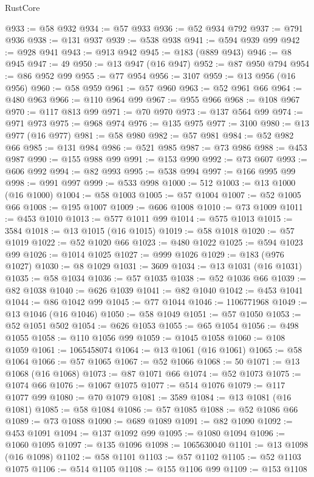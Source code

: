\begin{lexlean}{RustCore}
\begin{coremodule}
@933 := @58 @932
@934 := @57 @933
@936 := @52 @934 @792
@937 := @791 @936
@938 := @131 @937
@939 := @538 @938
@941 := @594 @939 @99
@942 := @928 @941
@943 := @913 @942
@945 := @183 (@889 @943)
@946 := @8 @945
@947 := 49
@950 := @13 @947 (@16 @947)
@952 := @87 @950 @794
@954 := @86 @952 @99
@955 := @77 @954
@956 := 3107
@959 := @13 @956 (@16 @956)
@960 := @58 @959
@961 := @57 @960
@963 := @52 @961 @66
@964 := @480 @963
@966 := @110 @964 @99
@967 := @955 @966
@968 := @108 @967
@970 := @117 @813 @99
@971 := @70 @970
@973 := @137 @564 @99
@974 := @971 @973
@975 := @968 @974
@976 := @135 @975
@977 := 3100
@980 := @13 @977 (@16 @977)
@981 := @58 @980
@982 := @57 @981
@984 := @52 @982 @66
@985 := @131 @984
@986 := @521 @985
@987 := @73 @986
@988 := @453 @987
@990 := @155 @988 @99
@991 := @153 @990
@992 := @73 @607
@993 := @606 @992
@994 := @82 @993
@995 := @538 @994
@997 := @166 @995 @99
@998 := @991 @997
@999 := @533 @998
@1000 := 512
@1003 := @13 @1000 (@16 @1000)
@1004 := @58 @1003
@1005 := @57 @1004
@1007 := @52 @1005 @66
@1008 := @195 @1007
@1009 := @606 @1008
@1010 := @73 @1009
@1011 := @453 @1010
@1013 := @577 @1011 @99
@1014 := @575 @1013
@1015 := 3584
@1018 := @13 @1015 (@16 @1015)
@1019 := @58 @1018
@1020 := @57 @1019
@1022 := @52 @1020 @66
@1023 := @480 @1022
@1025 := @594 @1023 @99
@1026 := @1014 @1025
@1027 := @999 @1026
@1029 := @183 (@976 @1027)
@1030 := @8 @1029
@1031 := 3609
@1034 := @13 @1031 (@16 @1031)
@1035 := @58 @1034
@1036 := @57 @1035
@1038 := @52 @1036 @66
@1039 := @82 @1038
@1040 := @626 @1039
@1041 := @82 @1040
@1042 := @453 @1041
@1044 := @86 @1042 @99
@1045 := @77 @1044
@1046 := 1106771968
@1049 := @13 @1046 (@16 @1046)
@1050 := @58 @1049
@1051 := @57 @1050
@1053 := @52 @1051 @502
@1054 := @626 @1053
@1055 := @65 @1054
@1056 := @498 @1055
@1058 := @110 @1056 @99
@1059 := @1045 @1058
@1060 := @108 @1059
@1061 := 1065458074
@1064 := @13 @1061 (@16 @1061)
@1065 := @58 @1064
@1066 := @57 @1065
@1067 := @52 @1066
@1068 := 50
@1071 := @13 @1068 (@16 @1068)
@1073 := @87 @1071 @66
@1074 := @52 @1073
@1075 := @1074 @66
@1076 := @1067 @1075
@1077 := @514 @1076
@1079 := @117 @1077 @99
@1080 := @70 @1079
@1081 := 3589
@1084 := @13 @1081 (@16 @1081)
@1085 := @58 @1084
@1086 := @57 @1085
@1088 := @52 @1086 @66
@1089 := @73 @1088
@1090 := @689 @1089
@1091 := @82 @1090
@1092 := @453 @1091
@1094 := @137 @1092 @99
@1095 := @1080 @1094
@1096 := @1060 @1095
@1097 := @135 @1096
@1098 := 1065630040
@1101 := @13 @1098 (@16 @1098)
@1102 := @58 @1101
@1103 := @57 @1102
@1105 := @52 @1103 @1075
@1106 := @514 @1105
@1108 := @155 @1106 @99
@1109 := @153 @1108

\end{coremodule}
\end{lexlean}
